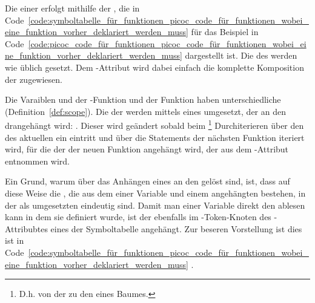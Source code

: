 Die  einer  erfolgt mithilfe der , die in Code~\ref{code:symboltabelle_für_funktionen_picoc_code_für_funktionen_wobei_eine_funktion_vorher_deklariert_werden_muss} für das Beispiel in Code~\ref{code:picoc_code_für_funktionen_picoc_code_für_funktionen_wobei_eine_funktion_vorher_deklariert_werden_muss} dargestellt ist. Die  des   werden wie üblich gesetzt. Dem -Attribut wird dabei einfach die komplette Komposition der   zugewiesen.

Die Varaiblen  und  der -Funktion und der Funktion  haben unterschiedliche  (Definition~\ref{def:scope}). Die  der  werden mittels eines   umgesetzt, der an den   drangehängt wird: . Dieser  wird geändert sobald beim \footnote{D.h. von der  zu den  eines Baumes.} Durchiterieren über den  des aktuellen  ein  eintritt und über die Statements der nächsten Funktion iteriert wird, für die der  der neuen Funktion  angehängt wird, der aus dem -Attribut entnommen wird.

Ein Grund, warum  über das Anhängen eines  an den  gelöst sind, ist, dass auf diese Weise die , die aus dem  einer Variable und einem angehängten  bestehen, in der als  umgesetzten  eindeutig sind. Damit man einer Variable direkt den  ablesen kann in dem sie definiert wurde, ist der  ebenfalls im -Token-Knoten des -Attribubtes eines  der Symboltabelle angehängt. Zur beseren Vorstellung ist dies ist in Code~\ref{code:symboltabelle_für_funktionen_picoc_code_für_funktionen_wobei_eine_funktion_vorher_deklariert_werden_muss} .

